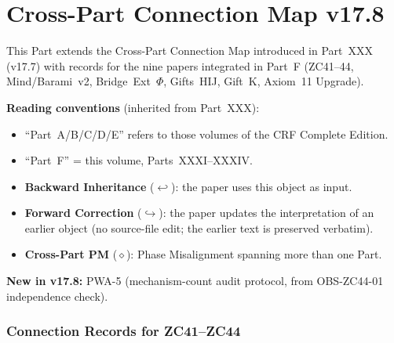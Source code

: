 \documentclass[12pt, a4paper]{article}
\begin{document}




\newpage

\part{Cross-Part Connection Map v17.8}
\label{part:xxxiv}

\begin{conmapbox}[title={Part XXXIV --- Purpose and Reading
  Conventions}]
This Part extends the Cross-Part Connection Map introduced in
Part~XXX (v17.7) with records for the nine papers integrated
in Part~F (ZC41--44, Mind/Barami~v2, Bridge~Ext~$\Phi$,
Gifts~HIJ, Gift~K, Axiom~11 Upgrade).

\textbf{Reading conventions} (inherited from Part~XXX):
\begin{itemize}[leftmargin=2em, noitemsep]
\item ``Part~A/B/C/D/E'' refers to those volumes of the
  CRF Complete Edition.
\item ``Part~F'' = this volume, Parts~XXXI--XXXIV.
\item \textbf{Backward Inheritance} ($\hookleftarrow$): the
  paper uses this object as input.
\item \textbf{Forward Correction} ($\hookrightarrow$): the
  paper updates the interpretation of an earlier object
  (no source-file edit; the earlier text is preserved verbatim).
\item \textbf{Cross-Part PM} ($\diamond$): Phase Misalignment
  spanning more than one Part.
\end{itemize}

\textbf{New in v17.8:} PWA-5 (mechanism-count audit protocol,
from OBS-ZC44-01 independence check).
\end{conmapbox}

\newpage

\section{Connection Records for ZC41--ZC44}
\label{sec:cmap-physics}
\end{document}
